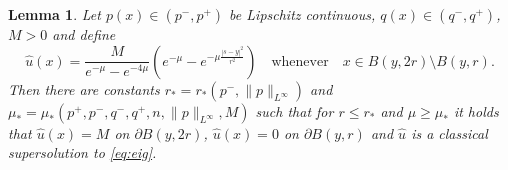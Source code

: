 \documentclass[12pt]{article}
\newtheorem{lemma}[theorem]{Lemma}
\numberwithin{komcounter}{section}
\begin{document}
\begin{lemma}
Let $p(x) \in (p^-, p^+)$ be Lipschitz continuous, $q(x) \in (q^-, q^+)$, $M > 0$ and define
\[
\hat{u}(x) = \frac{M}{e^{-\mu} - e^{-4\mu}} \left(  e^{-\mu} - e^{-\mu \frac{|s-y|^2}{r^2}}\right) \quad \text{whenever} \quad x \in B(y,2r)\setminus B(y,r).
\]
Then there are constants $r_* = r_*(p^-,\|p\|_{L^\infty})$ and $\mu_* = \mu_*(p^+,p^-,q^-, q^+,n,\|p\|_{L^\infty},M)$
such that for $r \leq r_*$ and $\mu \geq \mu_*$ it holds that $\hat{u}(x) = M$ on $\partial B(y,2r)$,
$\hat{u}(x) = 0$ on $\partial B(y,r)$ and $\hat{u}$ is a classical supersolution to \eqref{eq:eig}.
\end{lemma}
\end{document}
